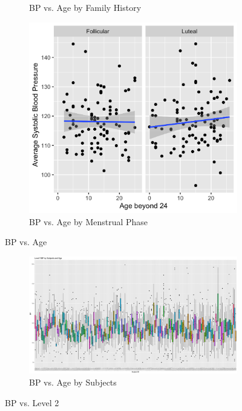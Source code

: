 \documentclass[12pt,twoside,letterpaper]{article}
\theoremstyle{definition}
\theoremstyle{definition}
\begin{document}
\begin{appendices}
\begin{figure}[h]
\begin{subfigure}[b]{0.3\textwidth}
        \caption[]%
        {{\small BP vs. Age by Family History}}
        \label{fig: bp v age and fh}
        \end{subfigure}
        \hfill
        \begin{subfigure}[b]{0.3\textwidth}
        \centering
        \includegraphics[width=\textwidth]{pics/bp by age and phase.png}
        \caption[]%
        {{\small BP vs. Age by Menstrual Phase}}
        \label{fig: bp v age and phase}
        \end{subfigure}
        \caption[]
        {\small BP vs. Age}
        \label{fig: bp v age and lv 2}
        \end{figure}

    \begin{figure}[h] 
        \centering
        \begin{subfigure}[b]{\textwidth}
            \centering
            \includegraphics[width=\textwidth]{pics/bp by id and age.png}
            \caption{BP vs. Age by Subjects}
            \label{fig: bp v id and age}
        \end{subfigure}
        \caption{BP vs. Level 2}
        \label{fig: bp v id and level2_1}
    \end{figure}


\end{appendices}
\end{document}
